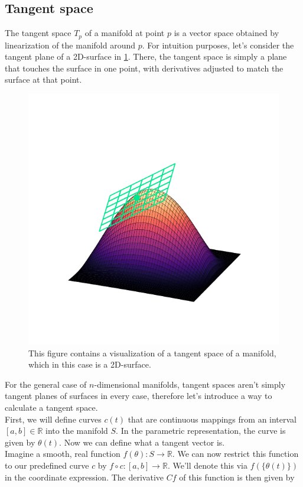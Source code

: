 \subsection{Tangent space}
The tangent space $T_p$ of a manifold at point $p$ is a vector space obtained by linearization of the manifold around $p$. For intuition purposes, let's consider the tangent plane of a 2D-surface in \cref{fig:TangentSpacePlot}. There, the tangent space is simply a plane that touches the surface in one point, with derivatives adjusted to match the surface at that point.
\begin{figure}\label{fig:TangentSpacePlot}
	\centering
	\includegraphics[width = 12cm, clip, trim= 0cm 1.5cm 0cm 2cm]{text/FisherInformation/plots/TangentSpacePlot.pdf}
	\caption{This figure contains a visualization of a tangent space of a manifold, which in this case is a 2D-surface.}
\end{figure}
For the general case of $n$-dimensional manifolds, tangent spaces aren't simply tangent planes of surfaces in every case, therefore let's introduce a way to calculate a tangent space.\\
First, we will define curves $c(t)$ that are continuous mappings from an interval $[a,b] \in \mathbb{R}$ into the manifold $S$. In the parametric representation, the curve is given by $\theta(t)$. Now we can define what a tangent vector is.\\
Imagine a smooth, real function $f(\theta): S \rightarrow \mathbb{R}$. We can now restrict this function to our predefined curve $c$ by $f \circ c : [a,b] \rightarrow \mathbb{R}$. We'll denote this via $f\left(\{\theta(t)\}\right)$ in the coordinate expression. The derivative $Cf$ of this function is then given by \cite{AmarisLectureNotes}
